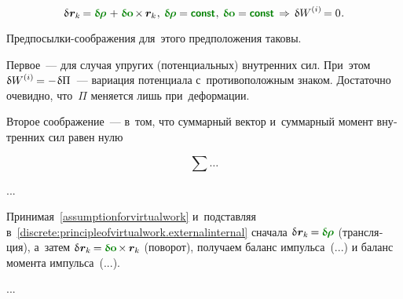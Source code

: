 \begin{otherlanguage}{russian}
\nopagebreak\vspace{-0.2em}\begin{equation}\label{assumptionforvirtualwork}
\variation{\hspace{.1ex}\bm{r}_k} \hspace{-0.16ex}
= \constvarvector{\hspace{-0.1ex}\bm{\rho}} \hspace{.2ex} + \hspace{.12ex} \constvarvector{\bm{o}} \hspace{-0.2ex} \times \hspace{-0.1ex} \bm{r}_k
\hspace{.1ex} , \:
\constvarvector{\hspace{-0.1ex}\bm{\rho}} = \boldconst \hspace{.1ex} , \:
\constvarvector{\bm{o}} = \boldconst
\hspace{.4ex} \Rightarrow \hspace{.32ex}
\variation{\internalwork} \hspace{-0.1ex} = 0 \hspace{.1ex}.
\end{equation}

\vspace{-0.1em} Предпосылки-соображения для~этого предположения таковы.

Первое~--- для случая упругих (потенциальных) внутренних сил. При~этом ${\variation{\internalwork} = - \hspace{.16ex} \variation{\Pi}}$~--- вариация потенциала с~противоположным знаком. Достаточно очевидно, что~$\Pi$ меняется лишь при~деформации.

Второе соображение~--- в~том, что суммарный вектор и~суммарный момент внутренних сил равен нулю

\begin{equation*}
\sum \ldots
\end{equation*}

...

Принимая~\eqref{assumptionforvirtualwork} и~подставляя в~\eqref{discrete:principleofvirtualwork.externalinternal} сначала ${\variation{\hspace{.1ex}\bm{r}_k} \hspace{-0.16ex} = \hspace{-0.08ex} \constvarvector{\hspace{-0.1ex}\bm{\rho}}}$ (трансляция), а~затем ${\variation{\hspace{.1ex}\bm{r}_k} \hspace{-0.16ex} = \hspace{-0.08ex} \constvarvector{\bm{o}} \hspace{-0.2ex} \times \hspace{-0.1ex} \bm{r}_k}$ (поворот), получаем баланс импульса~(...) и баланс момента импульса~(...).

...



\end{otherlanguage}

